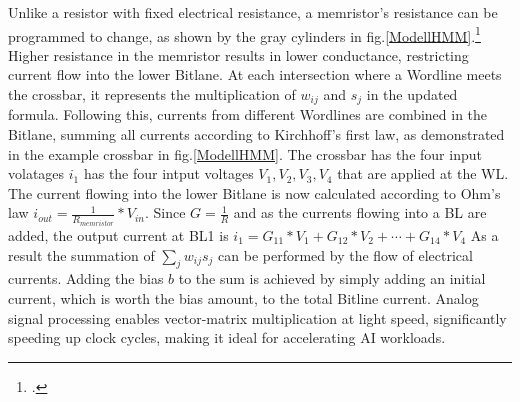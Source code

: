 Unlike a resistor with fixed electrical resistance, a memristor’s resistance can be programmed to change, as shown by the gray cylinders in fig.\ref{ModellHMM}.\footcite[cf][124]{sungPerspectiveReviewMemristive2018}
Higher resistance in the memristor results in lower conductance, restricting current flow into the lower Bitlane.
At each intersection where a Wordline meets the crossbar, it represents the multiplication of \(w_{ij}\) and \(s_j\) 
in the updated formula.
Following this, currents from different Wordlines are combined in the Bitlane, summing all currents according to Kirchhoff's first law, as demonstrated in the example crossbar in fig.\ref{ModellHMM}.
The crossbar has the four input volatages \(i_{1}\) has the four intput voltages \(V_{1}, V_{2}, V_{3}, V_{4}\) that are applied at the WL.
The current flowing into the lower Bitlane is now calculated according to Ohm's law \( i_{out} = \frac{1}{R_{memristor}} * V_{in}\).
Since \( G = \frac{1}{R}\) and as the currents flowing into a BL are added, the output current at BL1 is \( i_{1} = G_{11}*V_1 + G_{12}*V_2 + \cdots + G_{14}*V_4\)
As a result the summation of \(\sum_j w_{ij} s_j\) can be performed by the flow of electrical currents.
Adding the bias \(b\) to the sum is achieved by simply adding an initial current, which is worth the bias amount, to the total Bitline current.
Analog signal processing enables vector-matrix multiplication at light speed, significantly speeding up clock cycles, making it ideal for accelerating AI workloads.


